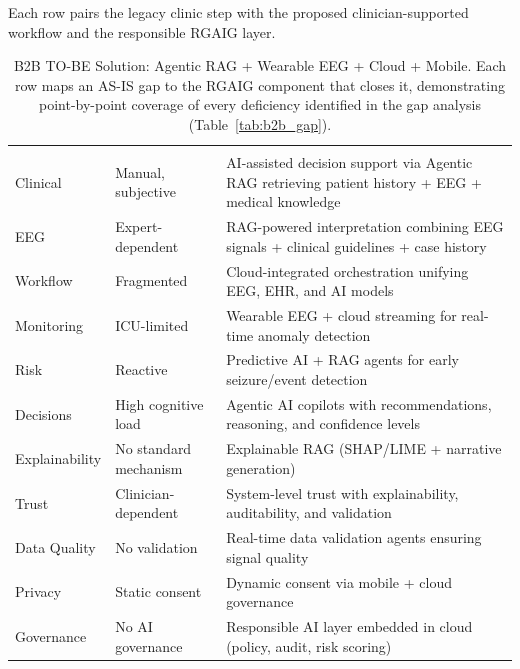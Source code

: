 \noindent Each row pairs the legacy clinic step with the proposed clinician-supported workflow and the responsible RGAIG layer.
{\tablestripes\tablefontsize
\begin{xltabular}{\textwidth}{@{} >{\raggedright\arraybackslash}p{3.0cm} >{\raggedright\arraybackslash}p{3.2cm} L @{}}
\caption[B2B TO-BE Solution: Agentic RAG + Wearable EEG + Cloud +]{B2B TO-BE Solution: Agentic RAG + Wearable EEG + Cloud + Mobile. Each row maps an AS-IS gap to the RGAIG component that closes it, demonstrating point-by-point coverage of every deficiency identified in the gap analysis (Table~\ref{tab:b2b_gap}).}\label{tab:b2b_tobe} \\
\toprule
{} &  &  \\
\midrule
\endfirsthead
\toprule
{} &  &  \\
\midrule
\endhead
\bottomrule
\endlastfoot
Clinical & Manual, subjective & AI-assisted decision support via Agentic RAG retrieving patient history + EEG + medical knowledge \\
\addlinespace
EEG & Expert-dependent & RAG-powered interpretation combining EEG signals + clinical guidelines + case history \\
\addlinespace
Workflow & Fragmented & Cloud-integrated orchestration unifying EEG, EHR, and AI models \\
\addlinespace
Monitoring & ICU-limited & Wearable EEG + cloud streaming for real-time anomaly detection \\
\addlinespace
Risk & Reactive & Predictive AI + RAG agents for early seizure/event detection \\
\addlinespace
Decisions & High cognitive load & Agentic AI copilots with recommendations, reasoning, and confidence levels \\
\addlinespace
Explainability & No standard mechanism & Explainable RAG (SHAP/LIME + narrative generation) \\
\addlinespace
Trust & Clinician-dependent & System-level trust with explainability, auditability, and validation \\
\addlinespace
Data Quality & No validation & Real-time data validation agents ensuring signal quality \\
\addlinespace
Privacy & Static consent & Dynamic consent via mobile + cloud governance \\
\addlinespace
Governance & No AI governance & Responsible AI layer embedded in cloud (policy, audit, risk scoring) \\

\end{xltabular}}
